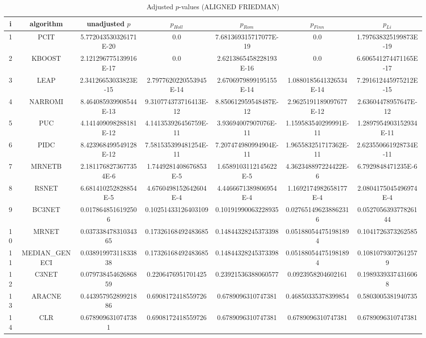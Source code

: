 \documentclass[a4paper,10pt]{article}
\begin{document}
\begin{landscape}
\begin{table}[!htp]
\centering\scriptsize
\caption{Adjusted $p$-values (ALIGNED FRIEDMAN)}
\begin{tabular}{ccccccc}
i&algorithm&unadjusted $p$&$p_{Holl}$&$p_{Rom}$&$p_{Finn}$&$p_{Li}$\\
\hline
1&PCIT&5.772043530326171E-20&0.0&7.681369315717077E-19&0.0&1.797638325199873E-19\\
2&KBOOST&2.121296775139916E-17&0.0&2.6213865458228193E-16&0.0&6.606541274471165E-17\\
3&LEAP&2.34126653033823E-15&2.7977620220553945E-14&2.6706979899195155E-14&1.0880185641326534E-14&7.291612445975212E-15\\
4&NARROMI&8.464085939908544E-13&9.310774373716413E-12&8.850612959548487E-12&2.9625191189097677E-12&2.63604478957647E-12\\
5&PUC&4.141409098288181E-12&4.141353926456759E-11&3.93694007907076E-11&1.159583540299991E-11&1.2897954903152934E-11\\
6&PIDC&8.423968499549128E-12&7.581535399481254E-11&7.207474980994904E-11&1.965583251717362E-11&2.623550661928734E-11\\
7&MRNETB&2.1811768273677354E-6&1.7449281408676853E-5&1.6589103112145622E-5&4.362348897224422E-6&6.7929848471235E-6\\
8&RSNET&6.681410252828854E-5&4.6760498152642604E-4&4.4466671389806954E-4&1.1692174982658177E-4&2.0804175045496974E-4\\
9&BC3NET&0.0178648516192506&0.10251433126403109&0.10191990063228935&0.027651496238862316&0.052705639377826144\\
10&MRNET&0.03733847831034365&0.17326168492483685&0.14844328245373398&0.051880544751981894&0.1041726373262585\\
11&MEDIAN_GENECI&0.03891997311833838&0.17326168492483685&0.14844328245373398&0.051880544751981894&0.10810793072612579\\
12&C3NET&0.07973845462686859&0.2206476951701425&0.23921536388060577&0.0923958204602161&0.19893393374316068\\
13&ARACNE&0.44395795289921886&0.6908172418559726&0.6789096310747381&0.46850335378399854&0.5803005381940735\\
14&CLR&0.6789096310747381&0.6908172418559726&0.6789096310747381&0.6789096310747381&0.6789096310747381\\
\hline
\end{tabular}
\end{table}


\newpage


\end{landscape}
\end{document}

